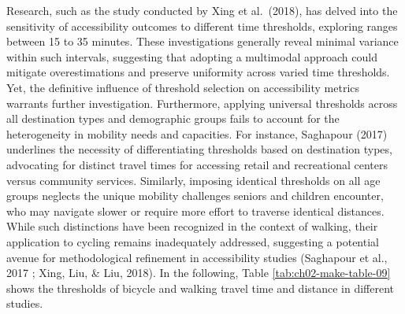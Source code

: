 \documentclass[
11pt, %
oneside, %
english, %
singlespacing, %
]{macthesis} %
\begin{document}
Research, such as the study conducted by Xing et al.~(2018), has delved into the sensitivity of accessibility outcomes to different time thresholds, exploring ranges between 15 to 35 minutes. These investigations generally reveal minimal variance within such intervals, suggesting that adopting a multimodal approach could mitigate overestimations and preserve uniformity across varied time thresholds. Yet, the definitive influence of threshold selection on accessibility metrics warrants further investigation. Furthermore, applying universal thresholds across all destination types and demographic groups fails to account for the heterogeneity in mobility needs and capacities. For instance, Saghapour (2017) underlines the necessity of differentiating thresholds based on destination types, advocating for distinct travel times for accessing retail and recreational centers versus community services. Similarly, imposing identical thresholds on all age groups neglects the unique mobility challenges seniors and children encounter, who may navigate slower or require more effort to traverse identical distances. While such distinctions have been recognized in the context of walking, their application to cycling remains inadequately addressed, suggesting a potential avenue for methodological refinement in accessibility studies (Saghapour et al., 2017 ; Xing, Liu, \& Liu, 2018). In the following, Table \ref{tab:ch02-make-table-09} shows the thresholds of bicycle and walking travel time and distance in different studies.
\end{document}
